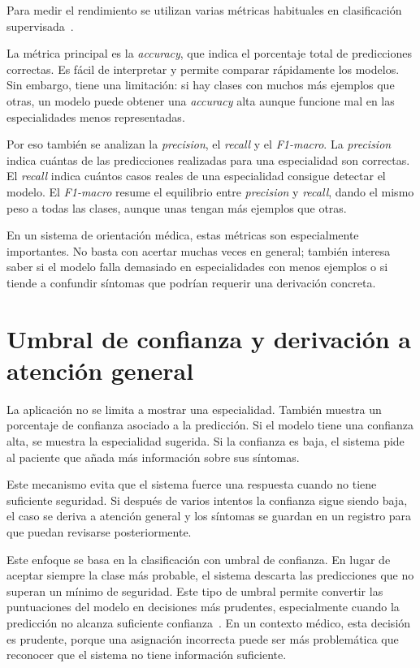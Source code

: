 Para medir el rendimiento se utilizan varias métricas habituales en clasificación supervisada~\cite{ibm_clasificacion, LopezUbeda2025}.

La métrica principal es la \textit{accuracy}, que indica el porcentaje total de predicciones correctas. Es fácil de interpretar y permite comparar rápidamente los modelos. Sin embargo, tiene una limitación: si hay clases con muchos más ejemplos que otras, un modelo puede obtener una \textit{accuracy} alta aunque funcione mal en las especialidades menos representadas.

Por eso también se analizan la \textit{precision}, el \textit{recall} y el \textit{F1-macro}. La \textit{precision} indica cuántas de las predicciones realizadas para una especialidad son correctas. El \textit{recall} indica cuántos casos reales de una especialidad consigue detectar el modelo. El \textit{F1-macro} resume el equilibrio entre \textit{precision} y \textit{recall}, dando el mismo peso a todas las clases, aunque unas tengan más ejemplos que otras.

En un sistema de orientación médica, estas métricas son especialmente importantes. No basta con acertar muchas veces en general; también interesa saber si el modelo falla demasiado en especialidades con menos ejemplos o si tiende a confundir síntomas que podrían requerir una derivación concreta.

\section{Umbral de confianza y derivación a atención general}

La aplicación no se limita a mostrar una especialidad. También muestra un porcentaje de confianza asociado a la predicción. Si el modelo tiene una confianza alta, se muestra la especialidad sugerida. Si la confianza es baja, el sistema pide al paciente que añada más información sobre sus síntomas.

Este mecanismo evita que el sistema fuerce una respuesta cuando no tiene suficiente seguridad. Si después de varios intentos la confianza sigue siendo baja, el caso se deriva a atención general y los síntomas se guardan en un registro para que puedan revisarse posteriormente.

Este enfoque se basa en la clasificación con umbral de confianza. En lugar de aceptar siempre la clase más probable, el sistema descarta las predicciones que no superan un mínimo de seguridad. Este tipo de umbral permite convertir las puntuaciones del modelo en decisiones más prudentes, especialmente cuando la predicción no alcanza suficiente confianza~\cite{google_umbral_clasificacion}. En un contexto médico, esta decisión es prudente, porque una asignación incorrecta puede ser más problemática que reconocer que el sistema no tiene información suficiente.

